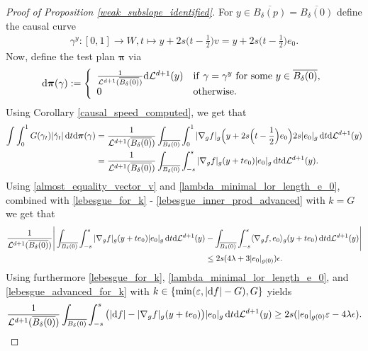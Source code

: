 \documentclass[a4paper,10pt]{article}
\numberwithin{equation}{section}
\newcommand{\e}{\varepsilon}
\newcommand{\di}{{\rm d}}
\begin{document}
\begin{proof}[Proof of Proposition \ref{weak_subslope_identified}]
For $y \in \overline{B_\delta(p)} = \overline{B_\delta(0)}$ define the causal curve 
\begin{align}
    \gamma^y\colon  [0,1] \to W, t \mapsto y + 2s \Big(t-\frac{1}{2}\Big)  v = y + 2s \Big(t-\frac{1}{2}\Big)e_0.
\end{align}
Now, define the test plan $\boldsymbol{\pi}$ via 
\begin{align}
    \di \boldsymbol{\pi}(\gamma) := \left\{ \begin{array}{ll}
       \frac{1}{\mathcal{L}^{d+1}(\overline{B_\delta(0)})} \di \mathcal{L}^{d+1}(y)   & \mathrm{if}\ \gamma = \gamma^y\ \mathrm{for\ some\ } y \in \overline{B_\delta(0)},  \\
       0  & \mathrm{otherwise}. 
    \end{array} \right.
\end{align}
Using Corollary \ref{causal_speed_computed}, we get that 
\begin{align}\label{evaluate_test_plan_at_G}
    \int \int_0^1 G(\gamma_t)|\dot{\gamma}_t| \, \di t \di \boldsymbol{\pi}(\gamma) &= \frac{1}{\mathcal{L}^{d+1}(\overline{B_\delta(0)})} \int_{\overline{B_\delta(0)}}  \int_0^1 |\nabla_g f|_g\Big(y +2s \Big(t-\frac{1}{2}\Big)  e_0 \Big) 2s|e_0|_g \, \di t \di \mathcal{L}^{d+1}(y)\nonumber \\
    &= \frac{1}{\mathcal{L}^{d+1}(\overline{B_\delta(0)})} \int_{\overline{B_\delta(0)}}  \int_{-s}^s |\nabla_g f|_g(y +te_0)|e_0|_g \, \di t \di \mathcal{L}^{d+1}(y).
\end{align}
Using \eqref{almost_equality_vector_v} and \eqref{lambda_minimal_lor_length_e_0}, combined with \eqref{lebesgue_for_k} - \eqref{lebesgue_inner_prod_advanced} with $k = G$ we get that 
\begin{align}\label{cauchy_schwartz_lebesgue_advanced}
    \frac{1}{\mathcal{L}^{d+1}(\overline{B_\delta(0)})} \Bigg|\int_{\overline{B_\delta(0)}}  \int_{-s}^s |\nabla_g f|_g(y +te_0)|e_0|_g \, \di t \di \mathcal{L}^{d+1}(y) &-\int_{\overline{B_\delta(0)}}\int_{-s}^s   \langle \nabla_g f, e_0\rangle_g(y +te_0) \, \di t \di \mathcal{L}^{d+1}(y)\Bigg|\nonumber \\
    &\leq 2s(4\lambda + 3|e_0|_{g(0)})\epsilon.
\end{align}
Using furthermore \eqref{lebesgue_for_k}, \eqref{lambda_minimal_lor_length_e_0}, and \eqref{lebesgue_advanced_for_k} with $k \in \{\min(\e, |\di f|-G), G\}$ yields
\begin{align}\label{contradiction_assumption_lebesgue_advanced}
    \frac{1}{\mathcal{L}^{d+1}(\overline{B_\delta(0)})} \int_{\overline{B_\delta(0)}}  \int_{-s}^s \big(|\di f|-|\nabla_g f|_g(y +te_0)\big)|e_0|_g \, \di t \di \mathcal{L}^{d+1}(y) \geq 2s(|e_0|_{g(0)}\e - 4\lambda\epsilon).

\end{align}
\end{proof}
\end{document}
